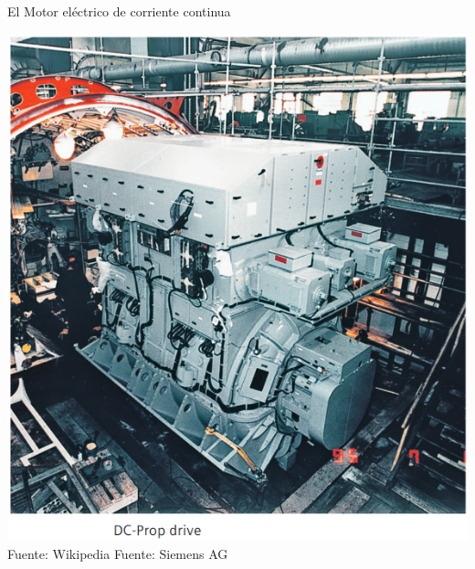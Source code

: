 \documentclass[presentation,aspectratio=169]{beamer}
\begin{document}
\begin{frame}[label={sec:orgeb455fe}]{El Motor eléctrico de corriente continua}
\begin{center}
\includegraphics[width=0.6\textheight]{../../figures/Siemens-DC-prop.png}\\
{\footnotesize Fuente: Wikipedia \hspace*{3cm} Fuente: Siemens AG}
\end{center}
\end{frame}
\end{document}
